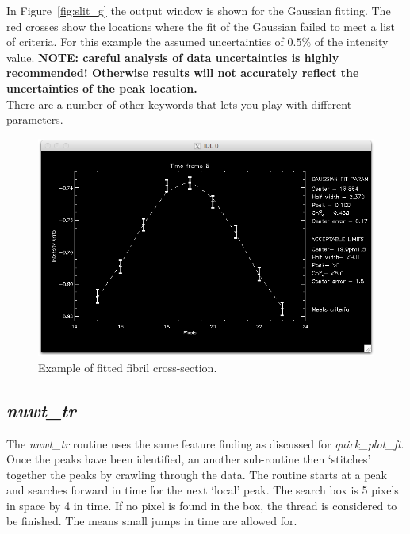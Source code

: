 \documentclass{article}
\begin{document}
 In Figure~\ref{fig:slit_g} the output window is shown for the Gaussian fitting. The red crosses show the locations where the fit of 
 the Gaussian failed to meet a list of criteria. For this example the assumed uncertainties of $0.5\%$ of the intensity value. \textbf{NOTE: careful analysis of data uncertainties is highly 
 recommended! Otherwise results will not accurately reflect the uncertainties of the peak location.} \\

There are a number of other keywords that lets you play with different parameters.

\begin{figure}[!tp]
\centering

\includegraphics[scale=0.6, clip=true, viewport=0.5cm 0.cm 29.cm 16.7cm]{gauss_fit_example.png}  

\caption{Example of fitted fibril cross-section. 
}\label{fig:fit_g}
\end{figure}

 
\subsection{\textit{nuwt\_tr}}

The \textit{nuwt\_tr} routine uses the same feature finding as discussed for \textit{quick\_plot\_ft}. 
Once the peaks have been identified, an another sub-routine then `stitches' together the peaks by 
crawling through the data. The routine starts at a peak and searches forward in time for the next `local' 
peak. The search box is 5 pixels in space by 4 in time. If no pixel is found in the box, the thread is 
considered to be finished. The means small jumps in time are allowed for. \\
\end{document}
